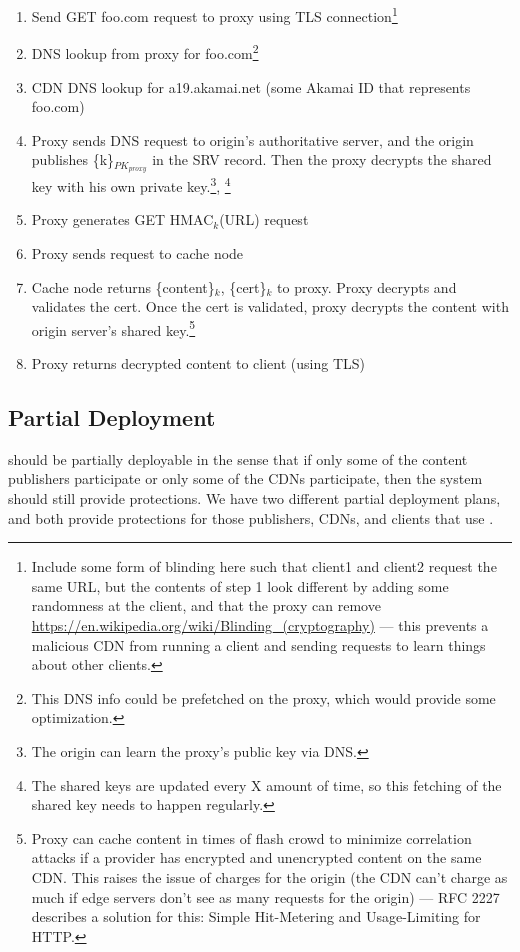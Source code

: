 \begin{enumerate}
\item Send GET foo.com request to proxy using TLS connection\footnote{Include some form of blinding here such that client1 and client2 request the same URL, but the contents of step 1 look different by adding some randomness at the client, and that the proxy can remove \url{https://en.wikipedia.org/wiki/Blinding_(cryptography)} --- this prevents a malicious CDN from running a client and sending requests to learn things about other clients.}
\item DNS lookup from proxy for foo.com\footnote{This DNS info could be prefetched on the proxy, which would provide some optimization.}
\item CDN DNS lookup for a19.akamai.net (some Akamai ID that represents foo.com)
\item Proxy sends DNS request to origin’s authoritative server, and the origin publishes \{k\}$_{PK_{proxy}}$ in the SRV record.  Then the proxy decrypts the shared key with his own private key.\footnote{The origin can learn the proxy’s public key via DNS.}, \footnote{The shared keys are updated every X amount of time, so this fetching of the shared key needs to happen regularly.}
\item Proxy generates GET HMAC$_k$(URL) request
\item Proxy sends request to cache node
\item Cache node returns \{content\}$_k$, \{cert\}$_k$ to proxy.  Proxy decrypts and validates the cert.  Once the cert is validated, proxy decrypts the content with origin server’s shared key.\footnote{Proxy can cache content in times of flash crowd to minimize correlation attacks if a provider has encrypted and unencrypted content on the same CDN. This raises the issue of charges for the origin (the CDN can’t charge as much if edge servers don’t see as many requests for the origin) --- RFC 2227 describes a solution for this: Simple Hit-Metering and Usage-Limiting for HTTP.}
\item Proxy returns decrypted content to client (using TLS)
\end{enumerate}

\subsection{Partial Deployment}
\label{sec:partial}
\system{} should be partially deployable in the sense that if only some of the content publishers participate or only some of the CDNs participate, then 
the system should still provide protections.  We have two different partial deployment plans, and both provide protections for those 
publishers, CDNs, and clients that use \system{}. 

